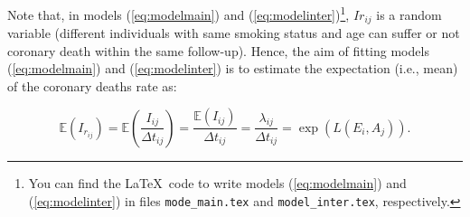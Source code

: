 \documentclass[a4paper,10pt]{article}\usepackage[]{graphicx}\usepackage[]{xcolor}
\begin{document}
\begin{itemize}
\end{itemize}

Note that, in models (\ref{eq:modelmain}) and (\ref{eq:modelinter})\footnote{You can find the \LaTeX\ code to write models (\ref{eq:modelmain}) and (\ref{eq:modelinter}) in files \texttt{mode\_main.tex} and \texttt{model\_inter.tex}, respectively.}, $Ir_{ij}$ is a random variable (different individuals with same smoking status and age can suffer or not coronary death within the same follow-up). Hence, the aim of fitting models (\ref{eq:modelmain}) and (\ref{eq:modelinter}) is to estimate the expectation (i.e., mean) of the coronary deaths rate as:

\begin{equation}
\tag{a}
\label{eq:eqA}
\mathbb{E}(I_{r_{ij}})=\mathbb{E}\left(\frac{I_{ij}}{\Delta t_{ij}}\right)=\frac{\mathbb{E}(I_{ij})}{\Delta t_{ij}}=\frac{\lambda_{ij}}{\Delta t_{ij}}=\exp(L(E_{i},A_{j})).
\end{equation}
\end{document}
